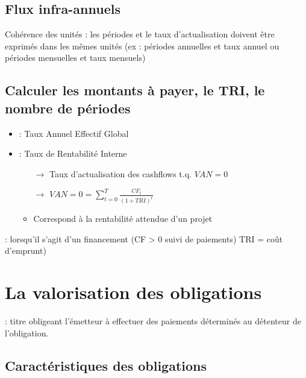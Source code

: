 \section{Flux infra-annuels}

\warning Cohérence des unités : les périodes et le taux d'actualisation doivent être exprimés dans les mêmes unités (ex : périodes annuelles et taux annuel ou périodes mensuelles et taux mensuels)

\section{Calculer les montants à payer, le TRI, le nombre de périodes}

\begin{itemize}
    \item {} : Taux Annuel Effectif Global
    \item {} : Taux de Rentabilité Interne
    \begin{itemize}
        \item[$\rightarrow$] Taux d'actualisation des cashflows t.q. $VAN = 0$
        \item[$\rightarrow$] $VAN = 0 = \sum_{t = 0}^T \frac{CF_t}{(1 + TRI)^t}$
        \item Correspond à la rentabilité attendue d'un projet
    \end{itemize}
\end{itemize}

 : lorsqu'il s'agit d'un financement (CF > 0 suivi de paiements) TRI = coût d’emprunt)

\addtocounter{chapter}{1}
\chapter{La valorisation des obligations}

 : titre obligeant l'émetteur à effectuer des paiements déterminés au détenteur de l'obligation.

\section{Caractéristiques des obligations}

